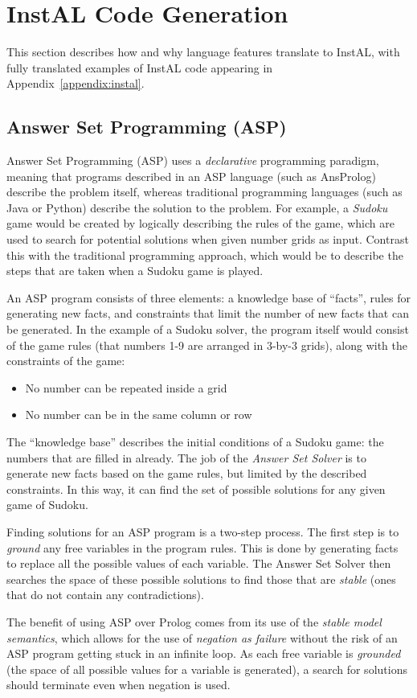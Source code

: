 \documentclass[11pt]{report}
\newcommand{\added}[2]{%
  \todo[noline,bordercolor=white,color=green,size=\scriptsize]{#2}
  \cbcolor{green}
  \begin{changebar}
    #1
  \end{changebar}%
  }%
\newcommand{\added}[2]{#1}
\begin{document}
\section{InstAL Code Generation}
\label{sec:t-codegen}
This section describes how and why language features translate to
InstAL, with fully translated examples of InstAL code appearing in Appendix~\ref{appendix:instal}.

\subsection{Answer Set Programming (ASP)}
\added{
Answer Set Programming (ASP) uses a \emph{declarative} programming paradigm, meaning
that programs described in an ASP language (such as AnsProlog) describe the
problem itself, whereas traditional programming languages (such as Java or
Python) describe the solution to the problem. For example, a \emph{Sudoku} game
would be created by logically describing the rules of the game, which are used
to search for potential solutions when given number grids as input. Contrast
this with the traditional programming approach, which would be to describe the
steps that are taken when a Sudoku game is played.

An ASP program consists of three elements: a knowledge base of ``facts'', rules
for generating new facts, and constraints that limit the number of new facts
that can be generated. In the example of a Sudoku solver, the program itself
would consist of the game rules (that numbers 1-9 are arranged in 3-by-3 grids),
along with the constraints of the game:

\begin{itemize}
\item No number can be repeated inside a grid
\item No number can be in the same column or row
\end{itemize}

The ``knowledge base'' describes the initial conditions of a Sudoku game: the
numbers that are filled in already. The job of the \emph{Answer Set Solver} is
to generate new facts based on the game rules, but limited by the described
constraints. In this way, it can find the set of possible solutions for any
given game of Sudoku.

Finding solutions for an ASP program is a two-step process. The first step is to
\emph{ground} any free variables in the program rules. This is done by
generating facts to replace all the possible values of each variable. The Answer
Set Solver then searches the space of
these possible solutions to find those that are \emph{stable} (ones that do not
contain any contradictions).

The benefit of using ASP over Prolog comes from its use of the \emph{stable
  model semantics}, which allows for the use of \emph{negation as failure}
without the risk of an ASP program getting stuck in an infinite loop. As each
free variable is \emph{grounded} (the space of all possible values for a
variable is generated), a search for solutions should terminate even when
negation is used.
}{2.4.2: Brief introduction to ASP}
\end{document}
